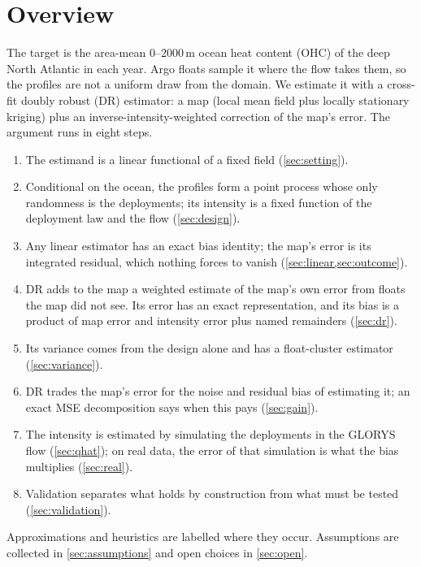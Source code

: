 
\section{Overview}\label{sec:overview}

The target is the area-mean $0$--$2000$\,m ocean heat content (OHC) of the deep North Atlantic in
each year. Argo floats sample it where the flow takes them, so the profiles are not a uniform draw
from the domain. We estimate it with a cross-fit doubly robust (DR) estimator: a map (local mean
field plus locally stationary kriging) plus an inverse-intensity-weighted correction of the map's
error. The argument runs in eight steps.
\begin{enumerate}
  \item The estimand is a linear functional of a fixed field (\cref{sec:setting}).
  \item Conditional on the ocean, the profiles form a point process whose only randomness is the
        deployments; its intensity is a fixed function of the deployment law and the flow
        (\cref{sec:design}).
  \item Any linear estimator has an exact bias identity; the map's error is its integrated
        residual, which nothing forces to vanish (\cref{sec:linear,sec:outcome}).
  \item DR adds to the map a weighted estimate of the map's own error from floats the map did not
        see. Its error has an exact representation, and its bias is a product of map error and
        intensity error plus named remainders (\cref{sec:dr}).
  \item Its variance comes from the design alone and has a float-cluster estimator
        (\cref{sec:variance}).
  \item DR trades the map's error for the noise and residual bias of
        estimating it; an exact MSE decomposition says when this pays (\cref{sec:gain}).
  \item The intensity is estimated by simulating the deployments in the GLORYS flow
        (\cref{sec:qhat}); on real data, the error of that simulation is what the bias multiplies
        (\cref{sec:real}).
  \item Validation separates what holds by construction from what must be tested
        (\cref{sec:validation}).
\end{enumerate}
Approximations and heuristics are labelled where they occur. Assumptions are collected in
\cref{sec:assumptions} and open choices in \cref{sec:open}.

